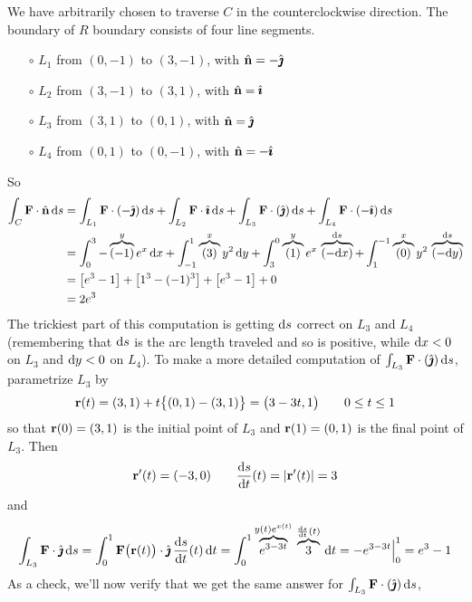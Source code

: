 \begin{solution}
We have arbitrarily chosen to traverse $C$ in the counterclockwise direction.
The boundary of $R$ boundary consists of four line segments.
\begin{itemize}\itemsep1pt \parskip0pt  %
\item[$\circ$]
$L_1$ from $(0,-1)$ to $(3,-1)$, with $\hat{\mathbf{n}} = -\hat{\pmb{\jmath}}$
\item[$\circ$]
$L_2$ from $(3,-1)$ to $(3,1)$, with $\hat{\mathbf{n}} = \hat{\pmb{\imath}}$
\item[$\circ$]
$L_3$ from $(3,1)$ to $(0,1)$, with $\hat{\mathbf{n}} = \hat{\pmb{\jmath}}$
\item[$\circ$]
$L_4$ from $(0,1)$ to $(0,-1)$, with $\hat{\mathbf{n}} = -\hat{\pmb{\imath}}$
\end{itemize}
So
\begin{align*}
\int_C \mathbf{F}\cdot\hat{\mathbf{n}}\,\mathrm{d}s
&= \int_{L_1} \mathbf{F}\cdot(-\hat{\pmb{\jmath}})\,\mathrm{d}s
   +\int_{L_2} \mathbf{F}\cdot \hat{\pmb{\imath}}\,\mathrm{d}s
   +\int_{L_3} \mathbf{F}\cdot(\hat{\pmb{\jmath}})\,\mathrm{d}s
   +\int_{L_4} \mathbf{F}\cdot(-\hat{\pmb{\imath}})\,\mathrm{d}s \\
&= \int_0^3  -\overbrace{(-1)}^{y}e^x\,\mathrm{d}x
   +\int_{-1}^1  \overbrace{(3)}^{x}y^2\,\mathrm{d}y
   +\int^0_3  \overbrace{(1)}^{y}e^x\,\overbrace{(-\mathrm{d}x)}^{\mathrm{d}s}
   +\int^{-1}_1  \overbrace{(0)}^{x}y^2\,\overbrace{(-\mathrm{d}y)}^{\mathrm{d}s} \\
&=\big[e^3-1\big]+\big[1^3-(-1)^3\big] + \big[e^3-1\big]+0 \\
&=2e^3
\end{align*}
The trickiest part of this computation is getting $\mathrm{d}s$ correct on
$L_3$ and $L_4$ (remembering that $\mathrm{d}s$ is the arc length traveled
and so is positive, while $\mathrm{d}x<0$ on $L_3$ and $\mathrm{d}y<0$ on $L_4$).
To make a more detailed computation of $\int_{L_3} \mathbf{F}\cdot(\hat{\pmb{\jmath}})\,\mathrm{d}s$,
parametrize $L_3$ by
\begin{equation*}
\mathbf{r}(t) = (3,1) + t\big\{(0,1)-(3,1)\big\}
       = \big(3-3t,1\big)\qquad
0\le t\le 1
\end{equation*}
so that $\mathbf{r}(0) = (3,1)$ is the initial point of $L_3$ and
$\mathbf{r}(1) = (0,1)$ is the final point of $L_3$. Then
\begin{equation*}
\vr'(t) = (-3,0)\qquad
\diff{s}{t}(t) = |\vr'(t)| = 3
\end{equation*}
and
\begin{align*}
\int_{L_3} \vF\cdot \hj\,\dee{s}
=\int_0^1 \vF\big(\vr(t)\big)\cdot \hj\,\diff{s}{t}(t)\,\dee{t}
=\int_0^1\overbrace{e^{3-3t}}^{y(t)e^{x(t)}}\,
\overbrace{3}^{\diff{s}{t}(t)}\,\dee{t}
=-e^{3-3t}\Big|_0^1
=e^3-1
\end{align*}
As a check, we'll now verify that we get the same answer for $\int_{L_3} \mathbf{F}\cdot(\hat{\pmb{\jmath}})\,\mathrm{d}s$,

\end{solution}

